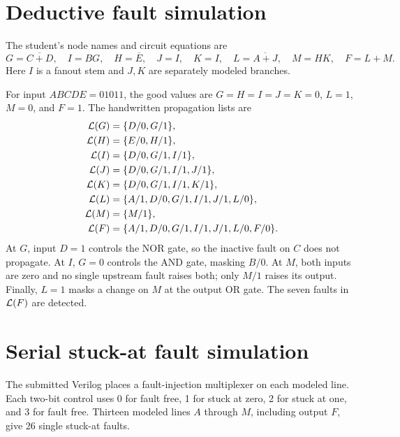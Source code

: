 \documentclass[11pt,a4paper]{article}
\begin{document}
\section{Deductive fault simulation}
The student's node names and circuit equations are
\[G=\overline{C+D},\quad I=BG,\quad H=\overline E,\quad J=I,\quad K=I,\quad L=\overline{A+J},\quad M=HK,\quad F=L+M.\]
Here $I$ is a fanout stem and $J,K$ are separately modeled branches.
\begin{center}
\end{center}
For input $ABCDE=01011$, the good values are $G=H=I=J=K=0$, $L=1$, $M=0$, and $F=1$. The handwritten propagation lists are
\begin{align*}
{\cal L}(G)&=\{D/0,G/1\},\\
{\cal L}(H)&=\{E/0,H/1\},\\
{\cal L}(I)&=\{D/0,G/1,I/1\},\\
{\cal L}(J)&=\{D/0,G/1,I/1,J/1\},\\
{\cal L}(K)&=\{D/0,G/1,I/1,K/1\},\\
{\cal L}(L)&=\{A/1,D/0,G/1,I/1,J/1,L/0\},\\
{\cal L}(M)&=\{M/1\},\\
{\cal L}(F)&=\{A/1,D/0,G/1,I/1,J/1,L/0,F/0\}.
\end{align*}
At $G$, input $D=1$ controls the NOR gate, so the inactive fault on $C$ does not propagate. At $I$, $G=0$ controls the AND gate, masking $B/0$. At $M$, both inputs are zero and no single upstream fault raises both; only $M/1$ raises its output. Finally, $L=1$ masks a change on $M$ at the output OR gate. The seven faults in ${\cal L}(F)$ are detected.

\section{Serial stuck-at fault simulation}
The submitted Verilog places a fault-injection multiplexer on each modeled line. Each two-bit control uses 0 for fault free, 1 for stuck at zero, 2 for stuck at one, and 3 for fault free. Thirteen modeled lines $A$ through $M$, including output $F$, give 26 single stuck-at faults.
\end{document}
